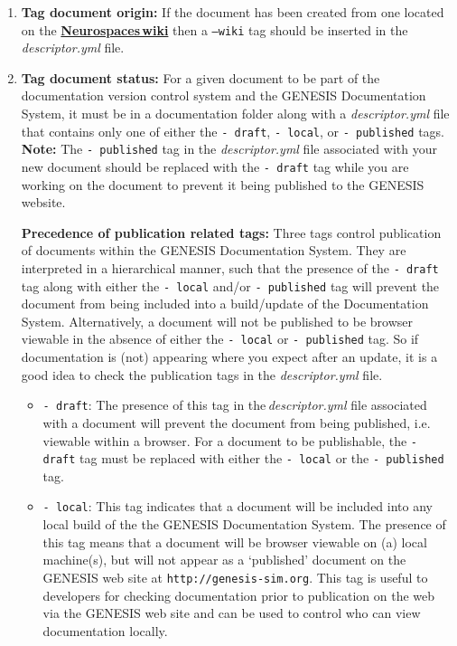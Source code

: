 \documentclass[12pt]{article}
\begin{document}
\begin{enumerate}
\begin{enumerate}
\item[]{\bf Tag document origin:} If the document has been created from one located on the \href{http://code.google.com/p/neurospaces/w/list}{\bf Neurospaces\,wiki} then a {\tt --wiki} tag should be inserted in the {\it descriptor.yml} file.

\item[]{\bf Tag document status:} For a given document to be part of the documentation version control system and the GENESIS Documentation System, it must be in a documentation folder along with a {\it descriptor.yml} file that contains only one of either the {\tt -\,draft}, {\tt -\,local}, or {\tt -\,published} tags. {\bf Note:} The {\tt-\,published} tag in the {\it descriptor.yml} file associated with your new document should be replaced with the {\tt -\,draft} tag  while you are working on the document to prevent it being published to the GENESIS website. 

{\bf Precedence of publication related tags:} Three tags control publication of documents within the GENESIS Documentation System. They are interpreted in a hierarchical manner, such that the presence of the {\tt  -\,draft} tag along with either the {\tt -\,local} and/or {\tt -\,published} tag will prevent the document from being included into a build/update of the Documentation System. Alternatively, a document will not be published to be browser viewable in the absence of either the {\tt -\,local} or {\tt -\,published} tag. So if documentation is (not) appearing where you expect after an update, it is a good idea to check the publication tags in the {\it descriptor.yml} file.

\begin{itemize}
	\item[]{\tt -\,draft}: The presence of this tag in the\,{\it descriptor.yml} file associated with a document will prevent the document 
	from being published,  i.e. viewable within a browser. For a document to be publishable, the {\tt -\,draft} tag must be replaced 
	with either the {\tt -\,local} or the {\tt -\,published} tag.
	
	\item[]{\tt -\,local}: This tag indicates that a document will be included into any local build of the the GENESIS Documentation 
	System. The presence of this tag means that a document will be browser viewable on (a) local machine(s), but will not appear as a 
	`published' document on the GENESIS web site at {\tt http://genesis-sim.org}. This tag is useful to developers for checking documentation
	prior to publication on the web via the GENESIS web site and can be used to control who can view documentation locally.
	

\end{itemize}
\end{enumerate}
\end{enumerate}
\end{document}
